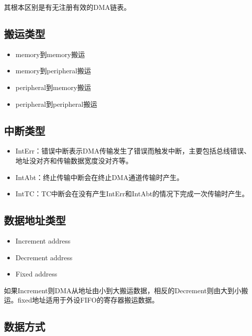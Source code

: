 \documentclass[
  12pt,
]{book}
\begin{document}
其根本区别是有无注册有效的DMA链表。

\hypertarget{ux642cux8fd0ux7c7bux578b}{%
\subsection{搬运类型}\label{ux642cux8fd0ux7c7bux578b}}

\begin{itemize}
\item
  memory到memory搬运
\item
  memory到peripheral搬运
\item
  peripheral到memory搬运
\item
  peripheral到peripheral搬运
\end{itemize}

\hypertarget{ux4e2dux65adux7c7bux578b}{%
\subsection{中断类型}\label{ux4e2dux65adux7c7bux578b}}

\begin{itemize}
\item
  IntErr：错误中断表示DMA传输发生了错误而触发中断，主要包括总线错误、地址没对齐和传输数据宽度没对齐等。
\item
  IntAbt：终止传输中断会在终止DMA通道传输时产生。
\item
  IntTC：TC中断会在没有产生IntErr和IntAbt的情况下完成一次传输时产生。
\end{itemize}

\hypertarget{ux6570ux636eux5730ux5740ux7c7bux578b}{%
\subsection{数据地址类型}\label{ux6570ux636eux5730ux5740ux7c7bux578b}}

\begin{itemize}
\item
  Increment address
\item
  Decrement address
\item
  Fixed address
\end{itemize}

如果Increment则DMA从地址由小到大搬运数据，相反的Decrement则由大到小搬运。fixed地址适用于外设FIFO的寄存器搬运数据。

\hypertarget{ux6570ux636eux65b9ux5f0f}{%
\subsection{数据方式}\label{ux6570ux636eux65b9ux5f0f}}
\end{document}
